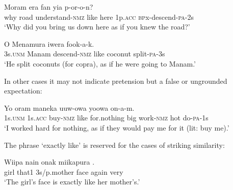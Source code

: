 \ea%
\label{ex:6:x1343}
\gll Moram  era      fan  yia p-or-o-n?\\
why  road  understand-\textsc{nmz}  like  here  1p.\textsc{acc} \textsc{bp}x-descend-\textsc{pa}-2s\\
\glt `Why did you bring us down here as if you knew the road?'
\z

\ea%
\label{ex:6:x1344}
\gll O  Menamura      iwera  fook-a-k. \\
3s.\textsc{unm}  Manam  descend-\textsc{nmz}  like  coconut  split-\textsc{pa}-3s\\
\glt `He split coconuts (for copra), as if he were going to Manam.'
\z

In other cases it may not indicate pretension but a false or ungrounded expectation: 

\ea%
\label{ex:6:x1345}
\gll Yo        oram  maneka uuw-owa  yoowa  on-a-m. \\
1s.\textsc{unm}  1s.\textsc{acc}  buy-\textsc{nmz}  like  for.nothing  big work-\textsc{nmz}  hot  do-\textsc{pa}-1s\\
\glt `I worked hard for nothing, as if they would pay me for it (lit: buy me).'
\z

The phrase   `exactly like' is reserved for the cases of striking similarity: 

\ea%
\label{ex:6:x1346}
\gll Wiipa  nain  onak  miikapura    . \\
girl  that1  3s/p.mother  face  again  very\\
\glt `The girl's face is exactly like her mother's.'
\z

